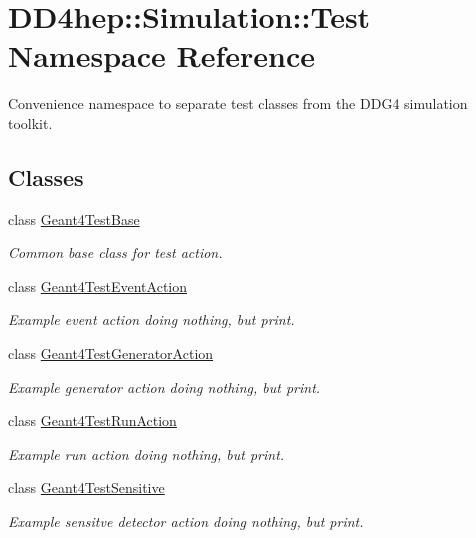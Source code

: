 \hypertarget{namespace_d_d4hep_1_1_simulation_1_1_test}{}\section{D\+D4hep\+:\+:Simulation\+:\+:Test Namespace Reference}
\label{namespace_d_d4hep_1_1_simulation_1_1_test}


Convenience namespace to separate test classes from the D\+D\+G4 simulation toolkit.  


\subsection*{Classes}
\begin{DoxyCompactItemize}
\item 
class \hyperlink{class_d_d4hep_1_1_simulation_1_1_test_1_1_geant4_test_base}{Geant4\+Test\+Base}
\begin{DoxyCompactList}\small\item\em Common base class for test action. \end{DoxyCompactList}\item 
class \hyperlink{class_d_d4hep_1_1_simulation_1_1_test_1_1_geant4_test_event_action}{Geant4\+Test\+Event\+Action}
\begin{DoxyCompactList}\small\item\em Example event action doing nothing, but print. \end{DoxyCompactList}\item 
class \hyperlink{class_d_d4hep_1_1_simulation_1_1_test_1_1_geant4_test_generator_action}{Geant4\+Test\+Generator\+Action}
\begin{DoxyCompactList}\small\item\em Example generator action doing nothing, but print. \end{DoxyCompactList}\item 
class \hyperlink{class_d_d4hep_1_1_simulation_1_1_test_1_1_geant4_test_run_action}{Geant4\+Test\+Run\+Action}
\begin{DoxyCompactList}\small\item\em Example run action doing nothing, but print. \end{DoxyCompactList}\item 
class \hyperlink{class_d_d4hep_1_1_simulation_1_1_test_1_1_geant4_test_sensitive}{Geant4\+Test\+Sensitive}
\begin{DoxyCompactList}\small\item\em Example sensitve detector action doing nothing, but print. \end{DoxyCompactList}\item 

\end{DoxyCompactItemize}
